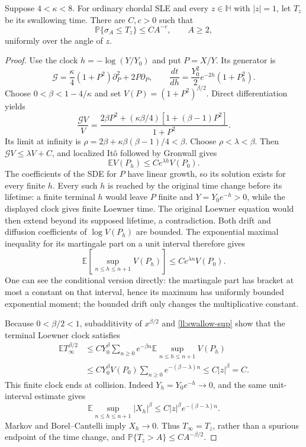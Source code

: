 \begin{lemma}
\label{ll:swallowing}
Suppose $4<\kappa<8$. For ordinary chordal SLE and every
$z\in\mathbb H$ with $|z|=1$, let $T_z$ be its swallowing time.
There are $C,c>0$ such that
\[
 \mathbb P\{\sigma_A\le T_z\}\le CA^{-c},\qquad A\ge2,
\]
uniformly over the angle of $z$.
\end{lemma}

\begin{proof}
Use the clock $h=-\log(Y/Y_0)$ and put $P=X/Y$.
Its generator is
\[
 \mathcal G=\frac\kappa4(1+P^2)\partial_P^2+2P\partial_P,
 \qquad
 \frac{dt}{dh}=\frac{Y_0^2}{2}e^{-2h}(1+P_h^2).
\]
Choose $0<\beta<1-4/\kappa$ and set
$V(P)=(1+P^2)^{\beta/2}$. Direct differentiation yields
\[
 \frac{\mathcal GV}{V}
 =\frac{2\beta P^2+(\kappa\beta/4)
                          [1+(\beta-1)P^2]}{1+P^2}.
\]
Its limit at infinity is
$\rho=2\beta+\kappa\beta(\beta-1)/4<\beta$.
Choose $\rho<\lambda<\beta$. Then
$\mathcal GV\le\lambda V+C$, and localized It\^o followed by
Gronwall gives
\begin{equation}
 \mathbb EV(P_h)\le Ce^{\lambda h}V(P_0).
 \label{ll:swallow-moment}
\end{equation}
The coefficients of the SDE for $P$ have linear growth, so its
solution exists for every finite $h$. Every such $h$ is reached by
the original time change before its lifetime: a finite terminal
$h$ would leave $P$ finite and $Y=Y_0e^{-h}>0$, while the displayed
clock gives finite Loewner time. The original Loewner equation
would then extend beyond its supposed lifetime, a contradiction.
Both drift and diffusion coefficients of $\log V(P_h)$ are bounded.
The exponential maximal inequality for its martingale part on a
unit interval therefore gives
\begin{equation}
 \mathbb E\left[\sup_{n\le h\le n+1}V(P_h)\right]
       \le Ce^{\lambda n}V(P_0).
 \label{ll:swallow-sup}
\end{equation}
One can see the conditional version directly: the martingale part
has bracket at most a constant on that interval, hence its maximum
has uniformly bounded exponential moment; the bounded drift only
changes the multiplicative constant.

Because $0<\beta/2<1$, subadditivity of $x^{\beta/2}$ and
\eqref{ll:swallow-sup} show that the terminal Loewner clock satisfies
\begin{align*}
 \mathbb E T_\infty^{\beta/2}
 &\le C Y_0^\beta\sum_{n\ge0}e^{-\beta n}
          \mathbb E\sup_{n\le h\le n+1}V(P_h)\\
 &\le C Y_0^\beta V(P_0)
             \sum_{n\ge0}e^{-(\beta-\lambda)n}
 \le C|z|^\beta=C.
\end{align*}
This finite clock ends at collision. Indeed $Y_h=Y_0e^{-h}\to0$,
and the same unit-interval estimate gives
\[
 \mathbb E\sup_{n\le h\le n+1}|X_h|^\beta
        \le C|z|^\beta e^{-(\beta-\lambda)n}.
\]
Markov and Borel--Cantelli imply $X_h\to0$.
Thus $T_\infty=T_z$, rather than a spurious endpoint of the time
change, and $\mathbb P\{T_z>A\}\le CA^{-\beta/2}$.


\end{proof}
